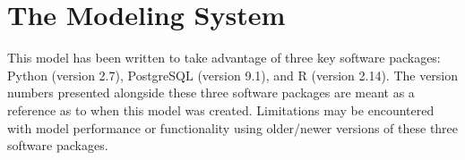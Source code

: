 %
%
%
%
%
\section{The Modeling System}
\label{sec:model}
This model has been written to take advantage of three key software packages: Python (version 2.7), PostgreSQL (version 9.1), and R (version 2.14).  
The version numbers presented alongside these three software packages are meant as a reference as to when this model was created.  
Limitations may be encountered with model performance or functionality using older/newer versions of these three software packages.


